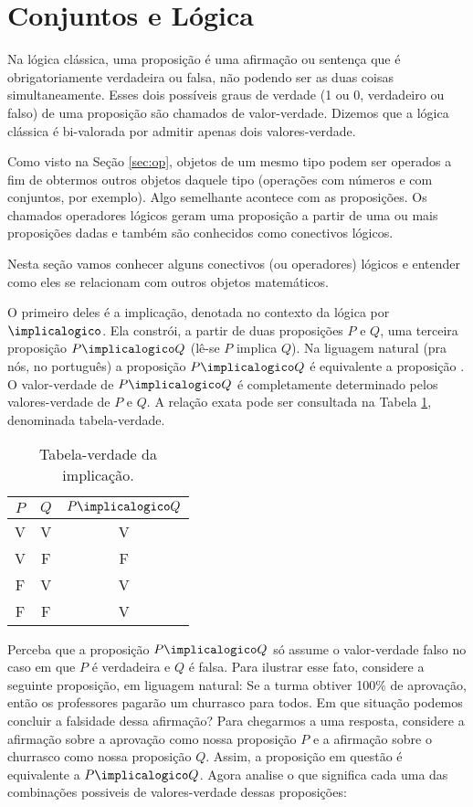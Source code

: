 \section{Conjuntos e Lógica}

Na lógica clássica, uma proposição é uma afirmação ou sentença que é obrigatoriamente verdadeira ou falsa, não podendo ser as duas coisas simultaneamente. Esses dois possíveis graus de verdade (1 ou 0, verdadeiro ou falso) de uma proposição são chamados de valor-verdade. Dizemos que a lógica clássica é bi-valorada por admitir apenas dois valores-verdade. 

Como visto na Seção \ref{sec:op}, objetos de um mesmo tipo podem ser operados a  fim de obtermos outros objetos daquele tipo (operações com números e com conjuntos, por exemplo). Algo semelhante acontece com as proposições. Os chamados operadores lógicos geram uma proposição a partir de uma ou mais proposições dadas e também são conhecidos como conectivos lógicos.
 
Nesta seção vamos conhecer alguns conectivos (ou operadores) lógicos e entender como eles se relacionam com outros objetos matemáticos.

O primeiro deles é a implicação, denotada no contexto da lógica por $\implicalogico$.  Ela constrói, a partir de duas proposições $P$ e $Q$, uma terceira proposição $P \implicalogico Q$ (lê-se $P$ implica $Q$). Na liguagem natural (pra nós, no português) a proposição $P\implicalogico Q$ é equivalente a proposição . O valor-verdade de $P \implicalogico Q$ é completamente determinado pelos valores-verdade de $P$ e $Q$. A relação exata pode ser consultada na Tabela \ref{tbl:implicacao}, denominada tabela-verdade.

\begin{table}[h]
	\centering
	\begin{tabular}{cc|c}
		$P$		& $Q$		& $P \implicalogico Q$ \\ \hline
		V		& V			& V			           \\
		V		& F			& F			           \\
		F		& V			& V			           \\
		F		& F			& V			           \\	
	\end{tabular}
	\caption{Tabela-verdade da implicação.}
	\label{tbl:implicacao}
\end{table}

Perceba que a proposição $P\implicalogico Q$ só assume o valor-verdade falso no caso em que $P$ é verdadeira e $Q$ é falsa. Para ilustrar esse fato, considere a seguinte proposição, em liguagem natural: Se a turma obtiver 100\% de aprovação, então os professores pagarão um churrasco para todos. Em que situação podemos concluir a falsidade dessa afirmação? 
Para chegarmos a uma resposta, considere a afirmação sobre a aprovação como nossa proposição $P$ e a afirmação sobre o churrasco como nossa proposição $Q$. Assim, a proposição em questão é equivalente a $P\implicalogico Q$. 
Agora analise o que significa cada uma das combinações possiveis de valores-verdade dessas proposições:

